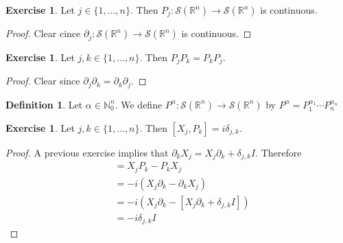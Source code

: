 \documentclass{book}
\theoremstyle{definition}
\newtheorem{defn}[definition]{Definition}
\newtheorem{ex}[definition]{Exercise}
\newcommand{\al}{\alpha}
\newcommand{\del}{\delta}
\newcommand{\N}{\mathbb{N}}
\newcommand{\R}{\mathbb{R}}
\newcommand{\MS}{\mathcal{S}}
\DeclareMathOperator*{\0}{\mbf{0}}
\DeclareMathOperator*{\1}{\mbf{1}}
\newcommand{\p}{\partial}
\begin{document}
	\begin{ex}
		Let $j \in \{1, \ldots, n\}$. Then $P_j: \MS(\R^n) \rightarrow \MS(\R^n)$ is continuous.
	\end{ex}
	
	\begin{proof}
		Clear cince $\p_j: \MS(\R^n) \rightarrow \MS(\R^n)$ is continuous.
	\end{proof}

	\begin{ex}
		Let $j,k \in \{1, \ldots, n\}$. Then $P_jP_k = P_kP_j$.
	\end{ex}
	
	\begin{proof}
		Clear since $\p_j \p_k = \p_k \p_j$. 
	\end{proof}
	
	\begin{defn}
		Let $\al \in \N_0^n$. We define $P^{\al}: \MS(\R^n) \rightarrow \MS(\R^n)$ by 
		$P^{\al} = P_1^{\al_1} \cdots P_n^{\al_n}$ 
	\end{defn}

	\begin{ex}
		Let $j, k \in \{1, \ldots, n\}$. Then $[X_j, P_k] = i \del_{j,k}$.
	\end{ex}

	\begin{proof}
		A previous exercise implies that $\p_k X_j = X_j \p_k + \del_{j,k}I$. Therefore
		\begin{align*}
			[X_j, P_k]
			& = X_j P_k - P_k X_j \\
			& = -i (X_j \p_k - \p_k X_j) \\
			& = -i (X_j \p_k - [X_j \p_k + \del_{j,k}I]) \\
			& = -i \del_{j,k}I
		\end{align*}
	\end{proof}
\end{document}
